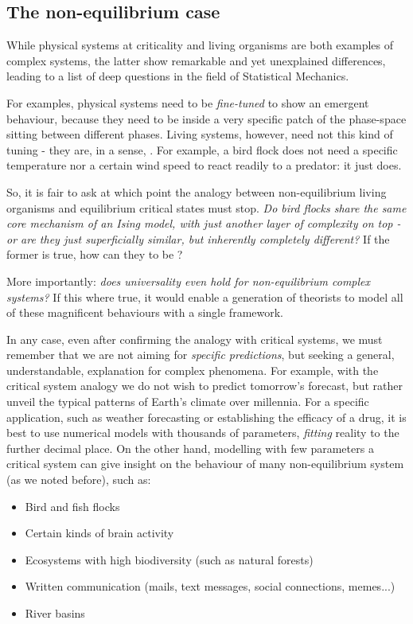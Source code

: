 \documentclass[../template.tex]{subfiles}
\begin{document}
\subsection{The non-equilibrium case}
While physical systems at criticality and living organisms are both examples of complex systems, the latter show remarkable and yet unexplained differences, leading to a list of deep questions in the field of Statistical Mechanics.

\medskip

For examples, physical systems need to be \textit{fine-tuned} to show an emergent behaviour, because they need to be inside a very specific patch of the phase-space sitting between different phases. Living systems, however, need not this kind of tuning - they are, in a sense, . For example, a bird flock does not need a specific temperature nor a certain wind speed to react readily to a predator: it just does.

\medskip

So, it is fair to ask at which point the analogy between non-equilibrium living organisms and equilibrium critical states must stop. \textit{Do bird flocks share the same core mechanism of an Ising model, with just another layer of complexity on top - or are they just superficially similar, but inherently completely different?} If the former is true, how can they  to be ?

\medskip

More importantly: \textit{does universality even hold for non-equilibrium complex systems?} If this where true, it would enable a generation of theorists to model all of these magnificent behaviours with a single framework.

\medskip

In any case, even after confirming the analogy with critical systems, we must remember that we are not aiming for \textit{specific predictions}, but seeking a general, understandable, explanation for complex phenomena. For example, with the critical system analogy we do not wish to predict tomorrow's forecast, but rather unveil the typical patterns of  Earth's climate over millennia. For a specific application, such as weather forecasting or establishing the efficacy of a drug, it is best to use numerical models with thousands of parameters, \textit{fitting} reality to the further decimal place. On the other hand, modelling with few parameters a critical system can give insight on the behaviour of many non-equilibrium system (as we noted before), such as:
\begin{itemize}
    \item Bird and fish flocks
    \item Certain kinds of brain activity
    \item Ecosystems with high biodiversity (such as natural forests)
    \item Written communication (mails, text messages, social connections, memes...)
    \item River basins
\end{itemize}
\end{document}
